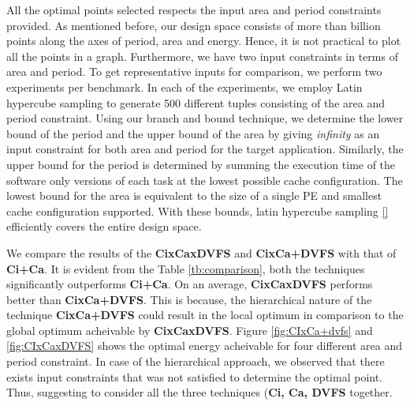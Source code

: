 All the optimal points selected respects the input area and period constraints provided. As mentioned before, our design space consists of more than billion points along the axes of period, area and energy. Hence, it is not practical to plot all the points in a graph. Furthermore, we have two input constraints in terms of area and period. To get representative inputs for comparison, we perform two experiments per benchmark. In each of the experiments, we employ Latin hypercube sampling to generate 500 different tuples consisting of the area and period constraint. Using our branch and bound technique, we determine the lower bound of the period and the upper bound of the area by giving \textit{infinity} as an input constraint for both area and period for the target application. Similarly, the upper bound for the period is determined by summing the execution time of the software only versions of each task at the lowest possible cache configuration. The lowest bound for the area is equivalent to the size of a single PE and smallest cache configuration supported. With these bounds, latin hypercube sampling \ref{} efficiently covers the entire design space. 

We compare the results of the \textbf{CixCaxDVFS} and \textbf{CixCa+DVFS} with that of \textbf{Ci+Ca}. It is evident from the Table \ref{tb:comparison}, both the techniques significantly outperforms \textbf{Ci+Ca}. On an average, \textbf{CixCaxDVFS} performs better than \textbf{CixCa+DVFS}. This is because, the hierarchical nature of the technique \textbf{CixCa+DVFS} could result in the local optimum in comparison to the global optimum acheivable by \textbf{CixCaxDVFS}. Figure \ref{fig:CIxCa+dvfs} and \ref{fig:CIxCaxDVFS} shows the optimal energy acheivable for four different area and period constraint. In case of the hierarchical approach, we observed that there exists input constraints that was not satisfied to determine the optimal point. Thus, suggesting to consider all the three techniques (\textbf{Ci, Ca, DVFS} together. 